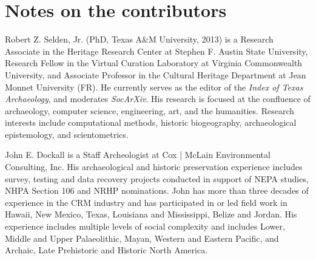 \documentclass[review]{elsarticle}
\begin{document}
\section*{Notes on the contributors}

Robert Z. Selden, Jr. (PhD, Texas A\&M University, 2013) is a Research Associate in the Heritage Research Center at Stephen F. Austin State University, Research Fellow in the Virtual Curation Laboratory at Virginia Commonwealth University, and Associate Professor in the Cultural Heritage Department at Jean Monnet University (FR). He currently serves as the editor of the \textit{Index of Texas Archaeology}, and moderates \textit{SocArXiv}. His research is focused at the confluence of archaeology, computer science, engineering, art, and the humanities. Research interests include computational methods, historic biogeography, archaeological epistemology, and scientometrics.

John E. Dockall is a Staff Archeologist at Cox | McLain Environmental Consulting, Inc. His archaeological and historic preservation experience includes survey, testing and data recovery projects conducted in support of NEPA studies, NHPA Section 106 and NRHP nominations. John has more than three decades of experience in the CRM industry and has participated in or led field work in Hawaii, New Mexico, Texas, Louisiana and Mississippi, Belize and Jordan. His experience includes multiple levels of social complexity and includes Lower, Middle and Upper Palaeolithic, Mayan, Western and Eastern Pacific, and Archaic, Late Prehistoric and Historic North America. 


\end{document}
